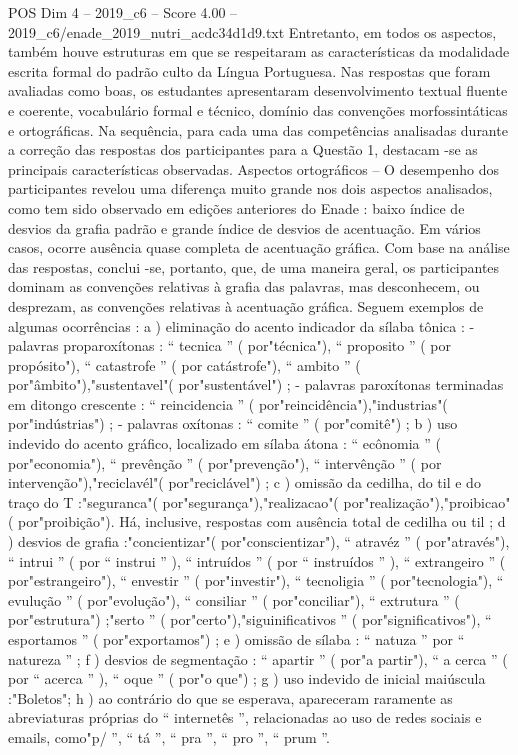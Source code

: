 \begin{textsample}{POS Dim 4 – 2019\_c6 – Score 4.00 – 2019\_c6/enade\_2019\_nutri\_acdc34d1d9.txt}
Entretanto, em todos os aspectos, também houve estruturas em que se respeitaram as características da modalidade escrita formal do padrão culto da Língua Portuguesa.
Nas respostas que foram avaliadas como boas, os estudantes apresentaram desenvolvimento textual fluente e coerente, vocabulário formal e técnico, domínio das convenções morfossintáticas e ortográficas.
Na sequência, para cada uma das competências analisadas durante a correção das respostas dos participantes para a Questão 1, destacam -se as principais características observadas.
Aspectos ortográficos – O desempenho dos participantes revelou uma diferença muito grande nos dois aspectos analisados, como tem sido observado em edições anteriores do Enade : baixo índice de desvios da grafia padrão e grande índice de desvios de acentuação.
Em vários casos, ocorre ausência quase completa de acentuação gráfica.
Com base na análise das respostas, conclui -se, portanto, que, de uma maneira geral, os participantes dominam as convenções relativas à grafia das palavras, mas desconhecem, ou desprezam, as convenções relativas à acentuação gráfica.
Seguem exemplos de algumas ocorrências : a ) eliminação do acento indicador da sílaba tônica : - palavras proparoxítonas : “ tecnica ” ( por"técnica"), “ proposito ” ( por propósito"), “ catastrofe ” ( por catástrofe"), “ ambito ” ( por"âmbito"),"sustentavel"( por"sustentável") ; - palavras paroxítonas terminadas em ditongo crescente : “ reincidencia ” ( por"reincidência"),"industrias"( por"indústrias") ; - palavras oxítonas : “ comite ” ( por"comitê") ; b ) uso indevido do acento gráfico, localizado em sílaba átona : “ ecônomia ” ( por"economia"), “ prevênção ” ( por"prevenção"), “ intervênção ” ( por intervenção"),"reciclavél"( por"reciclável") ; c ) omissão da cedilha, do til e do traço do T :"seguranca"( por"segurança"),"realizacao"( por"realização"),"proibicao"( por"proibição").
Há, inclusive, respostas com ausência total de cedilha ou til ; d ) desvios de grafia :"concientizar"( por"conscientizar"), “ atravéz ” ( por"através"), “ intrui ” ( por “ instrui ” ), “ intruídos ” ( por “ instruídos ” ), “ extrangeiro ” ( por"estrangeiro"), “ envestir ” ( por"investir"), “ tecnoligia ” ( por"tecnologia"), “ evulução ” ( por"evolução"), “ consiliar ” ( por"conciliar"), “ extrutura ” ( por"estrutura") ;"serto ” ( por"certo"),"siguinificativos ” ( por"significativos"), “ esportamos ” ( por"exportamos") ; e ) omissão de sílaba : “ natuza ” por “ natureza ” ; f ) desvios de segmentação : “ apartir ” ( por"a partir"), “ a cerca ” ( por “ acerca ” ), “ oque ” ( por"o que") ; g ) uso indevido de inicial maiúscula :"Boletos"; h ) ao contrário do que se esperava, apareceram raramente as abreviaturas próprias do “ internetês ”, relacionadas ao uso de redes sociais e emails, como"p/ ”, “ tá ”, “ pra ”, “ pro ”, “ prum ”.

\end{textsample}
